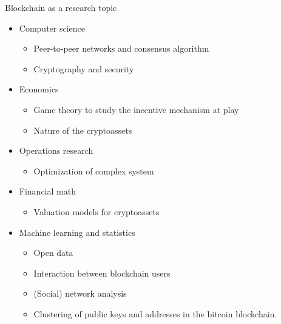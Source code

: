 \documentclass{beamer}
\begin{document}
\begin{frame}{Blockchain as a research topic}
\begin{itemize}
  \item Computer science
  \begin{itemize}
  \item Peer-to-peer networks and consensus algorithm
  \item Cryptography and security
  \end{itemize}
  \item Economics  
  \begin{itemize}
  \item Game theory to study the incentive mechanism at play
  \item Nature of the cryptoassets
  \end{itemize}
  \item Operations research  
  \begin{itemize}
  \item Optimization of complex system
  \end{itemize}
  \item Financial math  
  \begin{itemize}
  \item Valuation models for cryptoassets
  \end{itemize}
  \item Machine learning and statistics  
  \begin{itemize}
  \item Open data
  \item Interaction between blockchain users
  \item (Social) network analysis
  \item Clustering of public keys and addresses in the bitcoin blockchain.
  \end{itemize}
\end{itemize}

\end{frame}

\appendix
\end{document}
